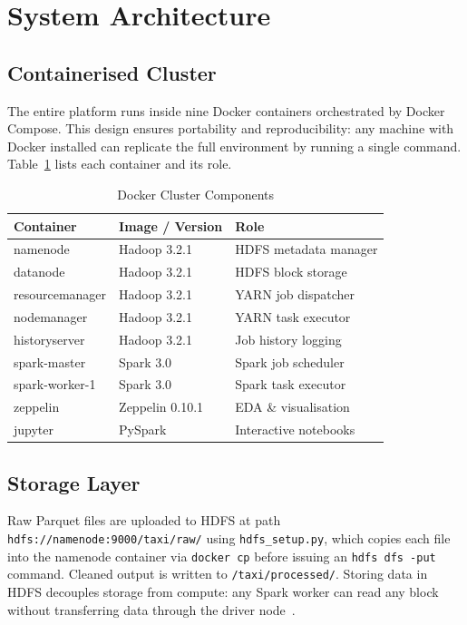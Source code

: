\documentclass[conference]{IEEEtran}
\begin{document}
\section{System Architecture}
\label{sec:arch}

\subsection{Containerised Cluster}

The entire platform runs inside nine Docker containers orchestrated
by Docker Compose. This design ensures portability and
reproducibility: any machine with Docker installed can replicate the
full environment by running a single command. Table~\ref{tab:arch}
lists each container and its role.

\begin{table}[h]
\caption{Docker Cluster Components}
\label{tab:arch}
\centering
\begin{tabular}{lll}
\toprule
\textbf{Container} & \textbf{Image / Version} & \textbf{Role} \\
\midrule
namenode        & Hadoop 3.2.1  & HDFS metadata manager \\
datanode        & Hadoop 3.2.1  & HDFS block storage \\
resourcemanager & Hadoop 3.2.1  & YARN job dispatcher \\
nodemanager     & Hadoop 3.2.1  & YARN task executor \\
historyserver   & Hadoop 3.2.1  & Job history logging \\
spark-master    & Spark 3.0     & Spark job scheduler \\
spark-worker-1  & Spark 3.0     & Spark task executor \\
zeppelin        & Zeppelin 0.10.1 & EDA \& visualisation \\
jupyter         & PySpark       & Interactive notebooks \\
\bottomrule
\end{tabular}
\end{table}

\subsection{Storage Layer}

Raw Parquet files are uploaded to HDFS at path
\texttt{hdfs://namenode:9000/taxi/raw/} using
\texttt{hdfs\_setup.py}, which copies each file into the namenode
container via \texttt{docker cp} before issuing an \texttt{hdfs dfs
-put} command. Cleaned output is written to
\texttt{/taxi/processed/}. Storing data in HDFS decouples storage
from compute: any Spark worker can read any block without
transferring data through the driver node~\cite{white2015hadoop}.
\end{document}
